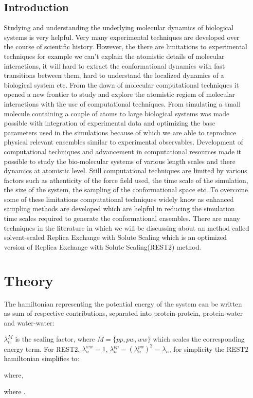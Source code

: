\documentclass{memoir}
\begin{document}
\section{Introduction}
Studying and understanding the underlying molecular dynamics of biological systems is very helpful. Very many experimental techniques are developed over the course of scientific history.
However, the there are limitations to experimental techniques for example we can't explain the atomistic details of molecular interactions, it will hard to extract the conformational dynamics
with fast transitions between them, hard to understand the localized dynamics of a biological system etc. From the dawn of molecular computational techniques it opened a new frontier to study
and explore the atomistic regiem of molecular interactions with the use of computational techniques. From simulating a small molecule containing a couple of atoms to large biological systems 
was made possible with integration of experimental data and optimizing the base parameters used in the simulations because of which we are able to reproduce physical relevant ensembles similar 
to experimental observables. Development of computational techniques and advancement in computational 
resources made it possible to study the bio-molecular systems of various length scales and there dynamics at atomistic level. Still computational techniques are limited by various factors
such as athenticity of the force field used, the time scale of the simulation, the size of the system, the sampling of the conformational space etc. To overcome some of these limitations
computational techniques widely know as enhanced sampling methods are developed which are helpful in reducing the simulation time scales required to generate the conformational ensembles.
There are many techniques in the literature in which we will be discussing about an method called solvent-scaled Replica Exchange with Solute Scaling which is an optimized version of 
Replica Exchange with Solute Scaling(REST2) method.        
  
\chapter{Theory} 

The hamiltonian representing the potential energy of the system can be written as sum of respective contributions, separated into protein-protein, protein-water and water-water:

$\lambda_{n}^M$ is the scaling factor, where $M=\{ pp, pw, ww\}
$ which scales the corresponding energy term. For REST2, $\lambda_n^{ww}=1$, $\lambda_n^{pp}=(\lambda_n^{pw})^2=\lambda_n$, for simplicity the REST2 hamiltonian simplifies to:

where,

where . 











\end{document}
